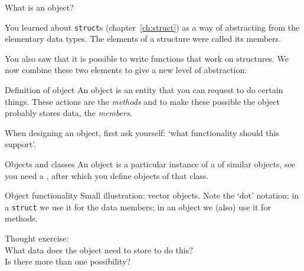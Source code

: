 
 {What is an object?}
\label{sec:object}

You learned about \lstinline{struct}s (chapter~\ref{ch:struct}) as a way of
abstracting from the elementary data types. The elements of a
structure were called its members.

You also saw that it is possible to write
functions that work on structures. We now combine these two elements
to give a new level of abstraction:

\begin{block}{Definition of object}
  \label{sl:object-def}
  An object is an entity that you can request to do certain
  things. These actions are the
  \emph{methods}
  and to make these possible the object probably stores
  data, the
  \emph{members}.

  When designing an object, first ask yourself: `what functionality
  should this support'.

\end{block}

\begin{block}{Objects and classes}
  \label{label:class-def}
  An object is a particular instance of a  of
  similar objects, see you need a ,
  after which you define objects of that class.
\end{block}

\begin{block}{Object functionality}
  \label{sl:object-functionality}
  Small illustration: vector objects.
  Note the `dot' notation; in a \lstinline{struct} we use it for the
  data members; in an object we (also) use it for methods.
\end{block}

\begin{exercise}
  \label{ex:pointdesign}
  Thought exercise:\\
  What data does the object need to store to do this?\\
  Is there more than one possibility?
\end{exercise}

